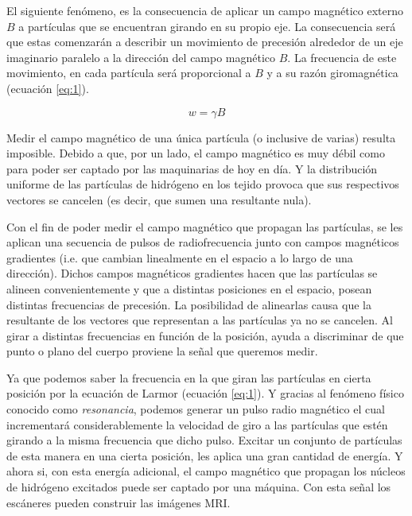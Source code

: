 El siguiente fen\'omeno, es la consecuencia de aplicar un campo magnético externo $B$ a partículas 
que se 
encuentran girando en su propio eje. La consecuencia será que estas comenzarán a describir un 
movimiento de precesi\'on alrededor de un eje imaginario paralelo a la direcci\'on del campo 
magnético $B$. La frecuencia de este movimiento, en cada part\'icula será proporcional a $B$ y a su 
razón giromagnética (ecuación \ref{eq:1}).

\begin{equation} 
\label{eq:1}
 w=\gamma  B
\end{equation}


Medir el campo magn\'etico de una \'unica part\'icula (o inclusive de varias) resulta imposible. 
Debido a que, por un lado, el campo magn\'etico es muy d\'ebil como para poder ser captado por las 
maquinarias de hoy en d\'ia. Y la distribuci\'on uniforme de las part\'iculas 
de hidr\'ogeno en los tejido provoca que sus respectivos vectores se cancelen (es decir, que sumen 
una resultante nula). 

Con el fin de poder medir el campo magnético que propagan las partículas, se les aplican una 
secuencia de pulsos de radiofrecuencia junto con campos magnéticos gradientes (i.e. que cambian 
linealmente en el espacio a lo largo de una direcci\'on). Dichos campos magn\'eticos gradientes 
hacen que las part\'iculas se alineen convenientemente y que a distintas posiciones en el espacio, 
posean distintas frecuencias de precesi\'on. La posibilidad de alinearlas causa que la resultante 
de 
los vectores que representan a las part\'iculas ya no se cancelen. Al girar a distintas 
frecuencias en funci\'on de la posici\'on, ayuda a discriminar de que punto o plano del cuerpo 
proviene la se\~nal que queremos medir.

Ya que podemos saber la frecuencia en la que giran las part\'iculas en cierta posici\'on por la
ecuación de Larmor (ecuación \ref{eq:1}). Y gracias al fen\'omeno f\'isico conocido como 
\textit{resonancia}, podemos generar un pulso radio magnético el cual 
incrementar\'a considerablemente la velocidad de giro a las part\'iculas que 
est\'en girando a la misma frecuencia que dicho pulso. Excitar un conjunto 
de part\'iculas de esta manera en una cierta posici\'on, les aplica una 
gran cantidad de energ\'ia. Y ahora si, con esta energía adicional, el campo 
magn\'etico que propagan los n\'ucleos de hidr\'ogeno excitados puede ser 
captado por una m\'aquina. Con esta se\~nal los escáneres pueden construir las 
im\'agenes MRI.


